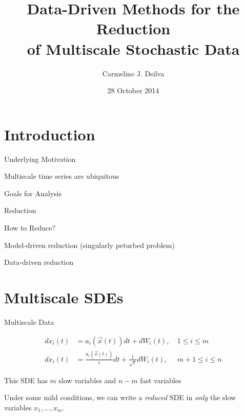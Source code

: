 \documentclass[12pt]{beamer}
\title{Data-Driven Methods for the Reduction \\of Multiscale Stochastic Data}
\author{Carmeline J. Dsilva}
\date{28 October 2014}
\begin{document}
\begin{frame}[plain]

\titlepage

\end{frame}

\section{Introduction}

\begin{frame}{Underlying Motivation}

Multiscale time series are ubiquitous

\end{frame}


\begin{frame}{Goals for Analysis}

Reduction

\end{frame}


\begin{frame}{How to Reduce?}

Model-driven reduction (singularly peturbed problem)

Data-driven reduction

\end{frame}

%
%


\section{Multiscale SDEs}

\begin{frame}{Multiscale Data}

\begin{equation*}
\begin{aligned}
dx_i(t) &= a_i(\vec{x}(t)) dt + dW_i(t), & \: 1 \le i \le m \\
dx_i(t) &= \frac{a_i(\vec{x}(t))}{\epsilon} dt + \frac{1}{\sqrt{\epsilon}} dW_i(t) , & \: m+1 \le i \le n
\end{aligned}
\end{equation*}

This SDE has $m$ slow variables and $n-m$ fast variables

Under some mild conditions, we can write a {\em reduced} SDE in {\em only} the slow variables $x_1, \dots, x_m$.

\end{frame}
\end{document}
